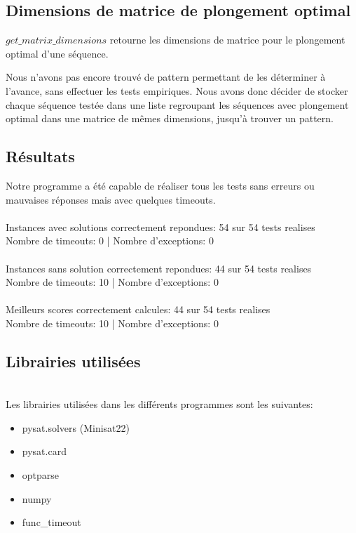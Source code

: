 \documentclass[utf8]{article}
\begin{document}
\subsection{Dimensions de matrice de plongement optimal}
$get\_matrix\_dimensions$ retourne les dimensions de matrice pour le plongement optimal d'une séquence.

Nous n'avons pas encore trouvé de pattern permettant de les déterminer à l'avance, sans effectuer les tests empiriques.
Nous avons donc décider de stocker chaque séquence testée dans une liste regroupant les séquences avec plongement optimal dans une matrice de mêmes dimensions, jusqu'à trouver un pattern.


\subsection{Résultats}
Notre programme a été capable de réaliser tous les tests sans erreurs ou mauvaises réponses mais avec quelques timeouts. \\
\\
Instances avec solutions correctement repondues: 54 sur 54 tests realises \\
Nombre de timeouts: 0 | Nombre d'exceptions: 0 \\
\\
Instances sans solution correctement repondues: 44 sur 54 tests realises \\
Nombre de timeouts: 10 | Nombre d'exceptions: 0 \\
\\
Meilleurs scores correctement calcules: 44 sur 54 tests realises \\
Nombre de timeouts: 10 | Nombre d'exceptions: 0

\newline
\subsection{Librairies utilisées}
\\ Les librairies utilisées dans les différents programmes sont les suivantes:
\begin{itemize}
    \item pysat.solvers (Minisat22)
    \item pysat.card
    \item optparse
    \item numpy
    \item func\_timeout
\end{itemize}
\end{document}
